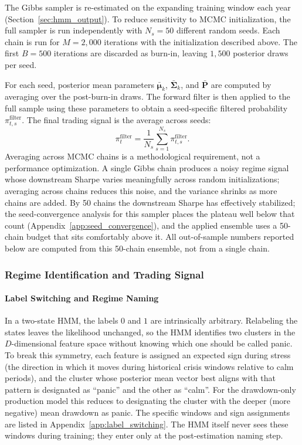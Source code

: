 The Gibbs sampler is re-estimated on the expanding training window each year (Section~\ref{sec:hmm_output}). To reduce sensitivity to MCMC initialization, the full sampler is run independently with $N_s = 50$ different random seeds. Each chain is run for $M=2{,}000$ iterations with the initialization described above. The first $B=500$ iterations are discarded as burn-in, leaving $1{,}500$ posterior draws per seed.

For each seed, posterior mean parameters $\bar{\boldsymbol{\mu}}_k$, $\bar{\boldsymbol{\Sigma}}_k$, and $\bar{\mathbf{P}}$ are computed by averaging over the post-burn-in draws. The forward filter is then applied to the full sample using these parameters to obtain a seed-specific filtered probability $\pi_{t,s}^{\text{filter}}$. The final trading signal is the average across seeds:
\begin{equation}
\pi_t^{\text{filter}} = \frac{1}{N_s} \sum_{s=1}^{N_s} \pi_{t,s}^{\text{filter}}.
\end{equation}
Averaging across MCMC chains is a methodological requirement, not a performance optimization. A single Gibbs chain produces a noisy regime signal whose downstream Sharpe varies meaningfully across random initializations; averaging across chains reduces this noise, and the variance shrinks as more chains are added. By 50 chains the downstream Sharpe has effectively stabilized; the seed-convergence analysis for this sampler places the plateau well below that count (Appendix~\ref{app:seed_convergence}), and the applied ensemble uses a 50-chain budget that sits comfortably above it. All out-of-sample numbers reported below are computed from this 50-chain ensemble, not from a single chain.

\subsubsection{Regime Identification and Trading Signal}\label{sec:regime_signal}

\paragraph{Label Switching and Regime Naming}\label{sec:label_switching}

In a two-state HMM, the labels $0$ and $1$ are intrinsically arbitrary. Relabeling the states leaves the likelihood unchanged, so the HMM identifies two clusters in the $D$-dimensional feature space without knowing which one should be called panic. To break this symmetry, each feature is assigned an expected sign during stress (the direction in which it moves during historical crisis windows relative to calm periods), and the cluster whose posterior mean vector best aligns with that pattern is designated as ``panic'' and the other as ``calm''. For the drawdown-only production model this reduces to designating the cluster with the deeper (more negative) mean drawdown as panic. The specific windows and sign assignments are listed in Appendix~\ref{app:label_switching}. The HMM itself never sees these windows during training; they enter only at the post-estimation naming step.

